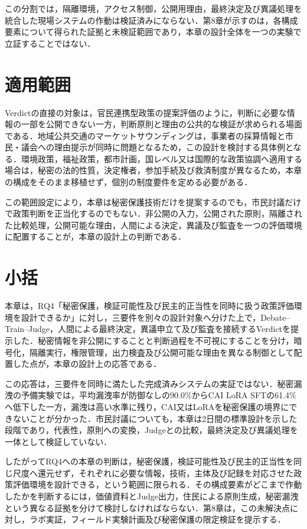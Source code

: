 この分割では，隔離環境，アクセス制御，公開用理由，最終決定及び異議処理を統合した現場システムの作動は検証済みにならない．第8章が示すのは，各構成要素について得られた証拠と未検証範囲であり，本章の設計全体を一つの実験で立証することではない．

\section{適用範囲}

Verdictの直接の対象は，官民連携型政策の提案評価のように，判断に必要な情報の一部を公開できない一方，判断原則と理由の公共的な検証が求められる場面である．地域公共交通のマーケットサウンディングは，事業者の採算情報と市民・議会への理由提示が同時に問題となるため，この設計を検討する具体例となる．環境政策，福祉政策，都市計画，国レベル又は国際的な政策協調へ適用する場合は，秘密の法的性質，決定権者，参加手続及び救済制度が異なるため，本章の構成をそのまま移植せず，個別の制度要件を定める必要がある．

この範囲設定により，本章は秘密保護技術だけを提案するのでも，市民討議だけで政策判断を正当化するのでもない．非公開の入力，公開された原則，隔離された比較処理，公開可能な理由，人間による決定，異議及び監査を一つの評価環境に配置することが，本章の設計上の判断である．

\section{小括}

本章は，RQ4「秘密保護，検証可能性及び民主的正当性を同時に扱う政策評価環境を設計できるか」に対し，三要件を別々の設計対象へ分けた上で，Debate--Train--Judge，人間による最終決定，異議申立て及び監査を接続するVerdictを提示した．秘密情報を非公開にすることと判断過程を不可視にすることを分け，暗号化，隔離実行，権限管理，出力検査及び公開可能な理由を異なる制御として配置した点が，本章の設計上の応答である．

この応答は，三要件を同時に満たした完成済みシステムの実証ではない．秘密漏洩の予備実験では，平均漏洩率が防御なしの90.0\%からCAI LoRA SFTの61.4\%へ低下した一方，漏洩は高い水準に残り，CAI又はLoRAを秘密保護の境界にできないことが分かった．市民討議についても，本章は2日間の標準設計を示した段階であり，代表性，原則への変換，Judgeとの比較，最終決定及び異議処理を一体として検証していない．

したがってRQ4への本章の判断は，秘密保護，検証可能性及び民主的正当性を同じ尺度へ還元せず，それぞれに必要な情報，技術，主体及び記録を対応させた政策評価環境を設計できる，という範囲に限られる．その構成要素がどこまで作動したかを判断するには，価値資料とJudge出力，住民による原則生成，秘密漏洩という異なる証拠を分けて検討しなければならない．第8章は，この未解決点に対し，ラボ実証，フィールド実験計画及び秘密保護の限定検証を提示する．

\begingroup
\sloppy
\printbibliography[heading=subbibliography,title={章末参考文献}]
\endgroup
